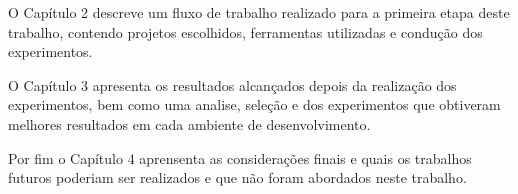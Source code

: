 O Capítulo 2 descreve um fluxo de trabalho realizado para a primeira etapa
 deste trabalho, contendo projetos escolhidos, ferramentas utilizadas e
 condução dos experimentos.

O Capítulo 3 apresenta os resultados alcançados depois da realização dos experimentos,
 bem como uma analise, seleção e dos experimentos que obtiveram melhores resultados
 em cada ambiente de desenvolvimento.
 
Por fim o Capítulo 4 aprensenta as considerações finais e quais os trabalhos futuros
 poderiam ser realizados e que não foram abordados neste trabalho.
